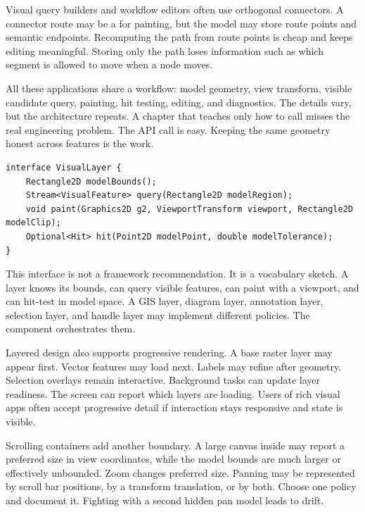 Visual query builders and workflow editors often use orthogonal connectors. A connector route may be a  for painting, but the model may store route points and semantic endpoints. Recomputing the path from route points is cheap and keeps editing meaningful. Storing only the path loses information such as which segment is allowed to move when a node moves.

All these applications share a workflow: model geometry, view transform, visible candidate query, painting, hit testing, editing, and diagnostics. The details vary, but the architecture repeats. A chapter that teaches only how to call  misses the real engineering problem. The API call is easy. Keeping the same geometry honest across features is the work.

\begin{lstlisting}[caption={A visual layer contract for rich components.}]
interface VisualLayer {
    Rectangle2D modelBounds();
    Stream<VisualFeature> query(Rectangle2D modelRegion);
    void paint(Graphics2D g2, ViewportTransform viewport, Rectangle2D modelClip);
    Optional<Hit> hit(Point2D modelPoint, double modelTolerance);
}
\end{lstlisting}

This interface is not a framework recommendation. It is a vocabulary sketch. A layer knows its bounds, can query visible features, can paint with a viewport, and can hit-test in model space. A GIS layer, diagram layer, annotation layer, selection layer, and handle layer may implement different policies. The component orchestrates them.

Layered design also supports progressive rendering. A base raster layer may appear first. Vector features may load next. Labels may refine after geometry. Selection overlays remain interactive. Background tasks can update layer readiness. The screen can report which layers are loading. Users of rich visual apps often accept progressive detail if interaction stays responsive and state is visible.

Scrolling containers add another boundary. A large canvas inside  may report a preferred size in view coordinates, while the model bounds are much larger or effectively unbounded. Zoom changes preferred size. Panning may be represented by scroll bar positions, by a transform translation, or by both. Choose one policy and document it. Fighting  with a second hidden pan model leads to drift.

